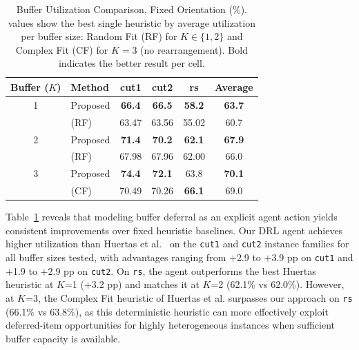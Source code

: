\documentclass[runningheads]{llncs}
\begin{document}
\begin{table}[h]
\centering
\caption{Buffer Utilization Comparison, Fixed Orientation (\%). \cite{huertas} values show the best single heuristic by average utilization per buffer size: Random Fit (RF) for $K \in \{1,2\}$ and Complex Fit (CF) for $K=3$ (no rearrangement). Bold indicates the better result per cell.}
\label{tab:buffer_results}
\setlength{\tabcolsep}{8pt}
\begin{tabular}{clcccc}
\toprule
\textbf{Buffer ($K$)} & \textbf{Method} & \textbf{cut1} & \textbf{cut2} & \textbf{rs} & \textbf{Average} \\
\midrule
1 & Proposed            & \textbf{66.4} & \textbf{66.5} & \textbf{58.2} & \textbf{63.7} \\
  & \cite{huertas} (RF) & 63.47         & 63.56         & 55.02         & 60.7 \\
\midrule
2 & Proposed            & \textbf{71.4} & \textbf{70.2} & \textbf{62.1} & \textbf{67.9} \\
  & \cite{huertas} (RF) & 67.98         & 67.96         & 62.00         & 66.0 \\
\midrule
3 & Proposed            & \textbf{74.4} & \textbf{72.1} & 63.8          & \textbf{70.1} \\
  & \cite{huertas} (CF) & 70.49         & 70.26         & \textbf{66.1} & 69.0 \\
\bottomrule
\end{tabular}
\end{table}

Table~\ref{tab:buffer_results} reveals that modeling buffer deferral as an explicit agent action yields consistent improvements over fixed heuristic baselines. Our DRL agent achieves higher utilization than Huertas et al.~\cite{huertas} on the \texttt{cut1} and \texttt{cut2} instance families for all buffer sizes tested, with advantages ranging from $+$2.9 to $+$3.9 pp on \texttt{cut1} and $+$1.9 to $+$2.9 pp on \texttt{cut2}. On \texttt{rs}, the agent outperforms the best Huertas heuristic at $K$=1 ($+$3.2 pp) and matches it at $K$=2 (62.1\% vs 62.0\%). However, at $K$=3, the Complex Fit heuristic of Huertas et al. surpasses our approach on \texttt{rs} (66.1\% vs 63.8\%), as this deterministic heuristic can more effectively exploit deferred-item opportunities for highly heterogeneous instances when sufficient buffer capacity is available.
\end{document}
